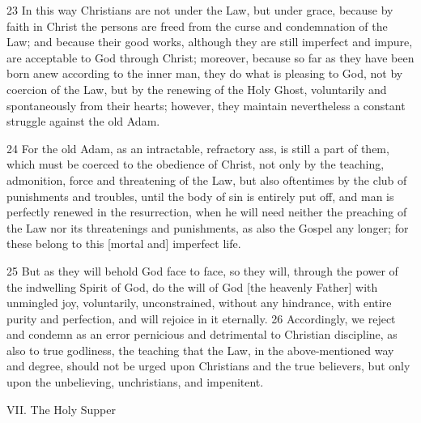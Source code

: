 23 In this way Christians are not under the Law, but under grace, because by faith in Christ the persons are freed from the curse and condemnation of the Law; and because their good works, although they are still imperfect and impure, are acceptable to God through Christ; moreover, because so far as they have been born anew according to the inner man, they do what is pleasing to God, not by coercion of the Law, but by the renewing of the Holy Ghost, voluntarily and spontaneously from their hearts; however, they maintain nevertheless a constant struggle against the old Adam.

24 For the old Adam, as an intractable, refractory ass, is still a part of them, which must be coerced to the obedience of Christ, not only by the teaching, admonition, force and threatening of the Law, but also oftentimes by the club of punishments and troubles, until the body of sin is entirely put off, and man is perfectly renewed in the resurrection, when he will need neither the preaching of the Law nor its threatenings and punishments, as also the Gospel any longer; for these belong to this [mortal and] imperfect life.

25 But as they will behold God face to face, so they will, through the power of the indwelling Spirit of God, do the will of God [the heavenly Father] with unmingled joy, voluntarily, unconstrained, without any hindrance, with entire purity and perfection, and will rejoice in it eternally.
26 Accordingly, we reject and condemn as an error pernicious and detrimental to Christian discipline, as also to true godliness, the teaching that the Law, in the above-mentioned way and degree, should not be urged upon Christians and the true believers, but only upon the unbelieving, unchristians, and impenitent.

VII. The Holy Supper

